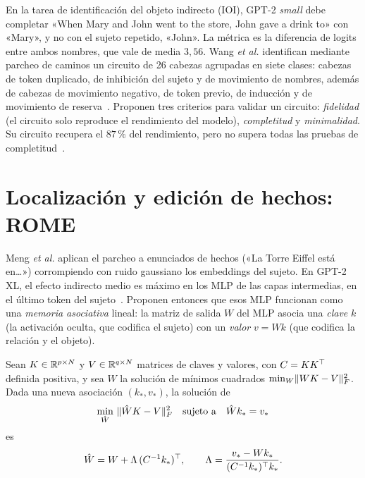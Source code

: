 \begin{ejemplo}\label{ej:ioi}
En la tarea de identificación del objeto indirecto (IOI), GPT-2 \emph{small} debe completar «When Mary and John went to the store, John gave a drink to» con «Mary», y no con el sujeto repetido, «John». La métrica es la diferencia de logits entre ambos nombres, que vale de media $3{,}56$. Wang \emph{et al.} identifican mediante parcheo de caminos un circuito de 26 cabezas agrupadas en siete clases: cabezas de token duplicado, de inhibición del sujeto y de movimiento de nombres, además de cabezas de movimiento negativo, de token previo, de inducción y de movimiento de reserva~\cite[§3]{wang-ioi}. Proponen tres criterios para validar un circuito: \emph{fidelidad} (el circuito solo reproduce el rendimiento del modelo), \emph{completitud} y \emph{minimalidad}. Su circuito recupera el $87\,\%$ del rendimiento, pero no supera todas las pruebas de completitud~\cite[§4]{wang-ioi}.
\end{ejemplo}

\section{Localización y edición de hechos: ROME}

Meng \emph{et al.} aplican el parcheo a enunciados de hechos («La Torre Eiffel está en…») corrompiendo con ruido gaussiano los embeddings del sujeto. En GPT-2 XL, el efecto indirecto medio es máximo en los MLP de las capas intermedias, en el último token del sujeto~\cite[§2.2]{meng}. Proponen entonces que esos MLP funcionan como una \emph{memoria asociativa} lineal: la matriz de salida $W$ del MLP asocia una \emph{clave} $k$ (la activación oculta, que codifica el sujeto) con un \emph{valor} $v=Wk$ (que codifica la relación y el objeto).

\begin{teorema}\label{teo:rome}
Sean $K\in\mathbb{R}^{p\times N}$ y $V\in\mathbb{R}^{q\times N}$ matrices de claves y valores, con $C=KK^{\top}$ definida positiva, y sea $W$ la solución de mínimos cuadrados $\min_W\lVert WK-V\rVert_F^{2}$. Dada una nueva asociación $(k_*,v_*)$, la solución de
\[
\min_{\hat W}\ \lVert\hat WK-V\rVert_F^{2}\quad\text{sujeto a}\quad \hat Wk_*=v_*
\]
es
\[
\hat W=W+\Lambda\,(C^{-1}k_*)^{\top},\qquad \Lambda=\frac{v_*-Wk_*}{(C^{-1}k_*)^{\top} k_*}.
\]
\end{teorema}


